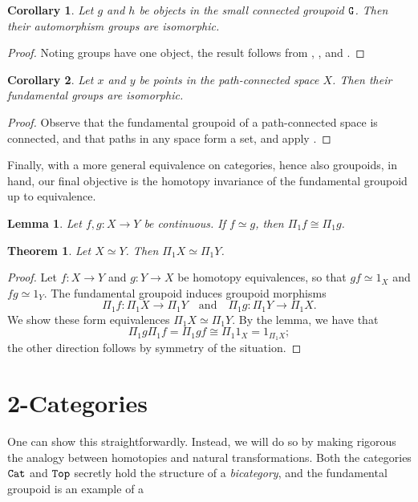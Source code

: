 \documentclass[11 pt]{amsart}
\theoremstyle{plain}   %
\newtheorem{thm}{Theorem}[section] %
\newtheorem{cor}{Corollary}[section]
\newtheorem{lemma}{Lemma}[section]
\theoremstyle{definition}
\theoremstyle{remark}
\numberwithin{equation}{section}
\newcommand{\cat}[1]{{\normalfont\texttt{#1}}}
\begin{document}
\begin{cor}\label{connected groups are isomorphic}
	Let $g$ and $h$ be objects in the small connected groupoid $\cat{G}$. Then their
	automorphism groups are isomorphic.
\end{cor}

\begin{proof}
	Noting groups have one object, the result follows from , , and .
\end{proof}

\begin{cor}
	Let $x$ and $y$ be points in the path-connected space $X$. Then their
	fundamental groups are isomorphic.
\end{cor}

\begin{proof}
	Observe that the fundamental groupoid of a path-connected space is connected,
	and that paths in any space form a set, and apply .
\end{proof}

Finally, with a more general equivalence on categories, hence also groupoids, in
hand, our final objective is the homotopy invariance of the fundamental
groupoid up to equivalence.

\begin{lemma}
	Let $f,g: X\rightarrow Y$ be continuous. If $f\simeq g$, then
	$\Pi_1f\cong\Pi_1g$.
\end{lemma}

	\begin{thm}
		Let $X\simeq Y$. Then $\Pi_1X\simeq \Pi_1Y$.
	\end{thm}

	\begin{proof}
		Let $f: X\rightarrow Y$ and $g: Y\rightarrow X$ be homotopy equivalences, so
		that $gf\simeq 1_X$ and $fg\simeq 1_Y$. The fundamental groupoid induces
		groupoid morphisms $$\Pi_1f: \Pi_1X\rightarrow\Pi_1Y\quad\text{and}\quad\Pi_1g:
			\Pi_1Y\rightarrow\Pi_1X.$$
		We show these form equivalences $\Pi_1X\simeq \Pi_1Y$. By the lemma, we have
		that $$\Pi_1g\Pi_1f = \Pi_1 gf\cong \Pi_1{1_X} = 1_{\Pi_1 X};$$ the other
		direction follows by symmetry of the situation.
	\end{proof}


	\section{2-Categories}

	One can show this straightforwardly. Instead, we will do so by making rigorous
	the analogy between homotopies and natural transformations. Both the categories
$\cat{Cat}$ and $\cat{Top}$ secretly hold the structure of a \emph{bicategory},
and the fundamental groupoid is an example of a



\end{document}
